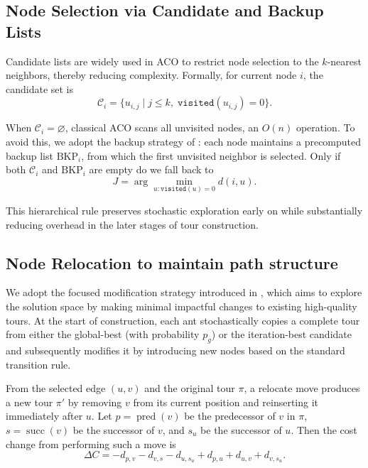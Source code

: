 \documentclass[a4paper,conference]{IEEEtran}
\newcommand{\calC}{\mathcal{C}}
\begin{document}
\subsection{Node Selection via Candidate and Backup Lists}
Candidate lists are widely used in ACO to restrict node selection to the $k$-nearest neighbors, thereby reducing complexity. Formally, for current node $i$, the candidate set is
\begin{equation}
\calC_i = \{u_{i,j} \mid j\le k,\; \texttt{visited}(u_{i,j})=0\}.
\end{equation}

When $\calC_i=\varnothing$, classical ACO scans all unvisited nodes, an $O(n)$ operation. To avoid this, we adopt the backup strategy of \cite{ACOTSP-MF}: each node maintains a precomputed backup list $\mathrm{BKP}_i$, from which the first unvisited neighbor is selected. Only if both $\calC_i$ and $\mathrm{BKP}_i$ are empty do we fall back to
\begin{equation}
J = \arg\min_{u:\texttt{visited}(u)=0} d(i,u).
\end{equation}

This hierarchical rule preserves stochastic exploration early on while substantially reducing overhead in the later stages of tour construction.

\subsection{Node Relocation to maintain path structure}
We adopt the focused modification strategy introduced in \cite{FACO2023}, which aims to explore the solution space by making minimal impactful changes to existing high-quality tours. At the start of construction, each ant stochastically copies a complete tour from either the global-best (with probability $p_g$) or the iteration-best candidate and subsequently modifies it by introducing new nodes based on the standard transition rule.

From the selected edge $(u,v)$ and the original tour $\pi$, a relocate move produces a new tour $\pi'$ by removing $v$ from its current position and reinserting it immediately after $u$. Let $p=\operatorname{pred}(v)$ be the predecessor of $v$ in $\pi$, $s=\operatorname{succ}(v)$ be the successor of $v$, and $s_u$ be the successor of $u$. Then the cost change from performing such a move is
\begin{equation}
\Delta C = -d_{p,v} - d_{v,s} - d_{u,s_u} + d_{p,u} + d_{u,v} + d_{v,s_u}.
\end{equation}
\end{document}
